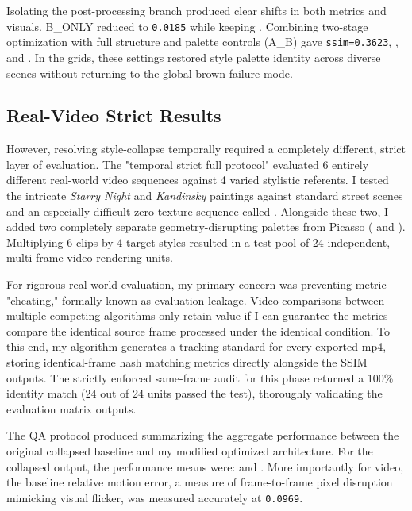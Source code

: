 \documentclass[12pt,letterpaper]{article}
\begin{document}
Isolating the post-processing branch produced clear shifts in both metrics and visuals. B\_ONLY reduced  to \texttt{0.0185} while keeping . Combining two-stage optimization with full structure and palette controls (A\_B) gave \texttt{ssim=0.3623}, , and . In the grids, these settings restored style palette identity across diverse scenes without returning to the global brown failure mode.

\subsection{Real-Video Strict Results}

However, resolving style-collapse temporally required a completely different, strict layer of evaluation. The "temporal strict full protocol" evaluated 6 entirely different real-world video sequences against 4 varied stylistic referents. I tested the intricate \emph{Starry Night} and \emph{Kandinsky} paintings against standard street scenes and an especially difficult zero-texture sequence called . Alongside these two, I added two completely separate geometry-disrupting palettes from Picasso ( and ). Multiplying 6 clips by 4 target styles resulted in a test pool of 24 independent, multi-frame video rendering units.

For rigorous real-world evaluation, my primary concern was preventing metric "cheating," formally known as evaluation leakage. Video comparisons between multiple competing algorithms only retain value if I can guarantee the metrics compare the identical source frame processed under the identical condition. To this end, my algorithm generates a  tracking standard for every exported mp4, storing identical-frame hash matching metrics directly alongside the SSIM outputs. The strictly enforced same-frame audit for this phase returned a 100\% identity match (24 out of 24 units passed the  test), thoroughly validating the evaluation matrix outputs.

The QA protocol produced  summarizing the aggregate performance between the original collapsed baseline and my modified optimized architecture. For the collapsed output, the performance means were:  and . More importantly for video, the baseline relative motion error, a measure of frame-to-frame pixel disruption mimicking visual flicker, was measured accurately at \texttt{0.0969}.
\end{document}
